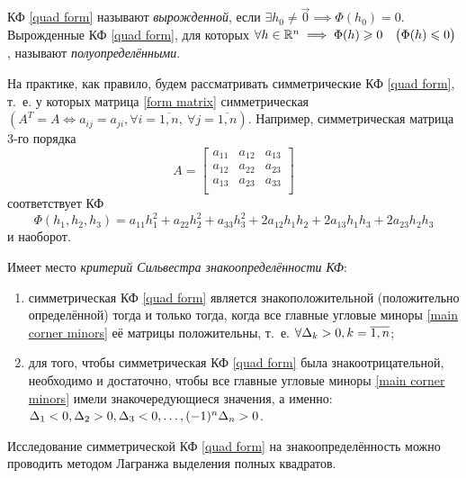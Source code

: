 \documentclass[../../main.tex]{subfiles}
\begin{document}
	КФ \eqref{quad form} называют \emph{вырожденной}, если
	$\exists h_0 \ne \vec{0} \implies \Phi(h_0) = 0$.
	Вырожденные КФ \eqref{quad form}, для которых
	$\forall h \in \mathbb{R}^n \implies \Phi(h) \geqslant 0
	\quad \big(\Phi(h) \leqslant 0\big)$,
	называют \emph{полуопределёнными}.
	
	На практике, как правило, будем рассматривать симметрические КФ
	\eqref{quad form}, т.~е. у которых матрица \eqref{form matrix} симметрическая
	$\left(A^T = A \iff a_{i j} = a_{j i},
	\forall i = \overline{1, n},\ \forall j = \overline{1, n}\right)$.
	Например, симметрическая матрица 3-го порядка
	\[
		A =
		\begin{bmatrix}
			a_{1 1} & a_{1 2} & a_{1 3} \\
			a_{1 2} & a_{2 2} & a_{2 3} \\
			a_{1 3} & a_{2 3} & a_{3 3} \\
		\end{bmatrix}
	\]
	соответствует КФ
	\[
		\Phi(h_1, h_2, h_3)
		= a_{1 1} h_1^2 + a_{2 2} h_2^2 + a_{3 3} h_3^2
		+ 2 a_{1 2} h_1 h_2 + 2 a_{1 3} h_1 h_3 + 2 a_{2 3} h_2 h_3
	\]
	и наоборот.
	
	Имеет место \emph{критерий Сильвестра знакоопределённости КФ}:
	\begin{enumerate}
		\item
		симметрическая КФ \eqref{quad form} является знакоположительной
		(положительно определённой)
		тогда и только тогда, когда
		все главные угловые миноры \eqref{main corner minors} её матрицы
		положительны,
		т.~е. $\forall \Delta_k > 0, k = \overline{1, n}$;
		
		\item
		для того, чтобы симметрическая КФ \eqref{quad form}
		была знакоотрицательной, необходимо и достаточно, чтобы все главные
		угловые миноры \eqref{main corner minors} имели знакочередующиеся
		значения, а именно: $\Delta_1 < 0, \Delta_2 > 0, \Delta_3 < 0,
		\ldots, (-1)^n \Delta_n > 0$.
	\end{enumerate}
	
	Исследование симметрической КФ \eqref{quad form} на знакоопределённость
	можно проводить методом Лагранжа выделения полных квадратов.
	
\end{document}
